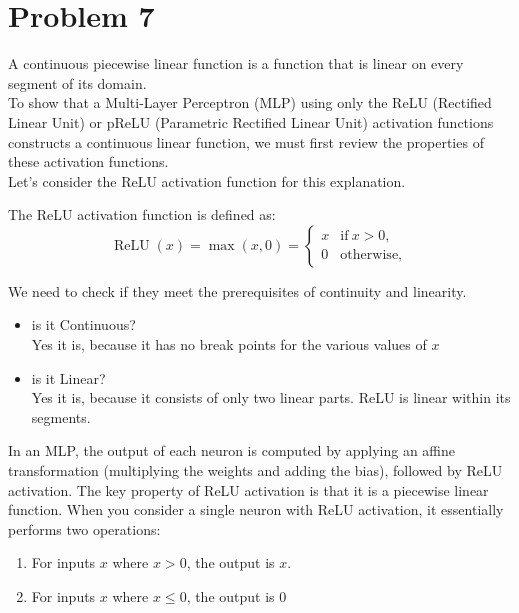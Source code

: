 \section{Problem 7}
A continuous piecewise linear function is a function that is linear on every segment of its domain.\\
To show that a Multi-Layer Perceptron (MLP) using only the ReLU (Rectified Linear Unit) or pReLU (Parametric Rectified Linear Unit) activation functions constructs a continuous linear function, we must first review the properties of these activation functions. \\

Let’s consider the ReLU activation function for this explanation.

The ReLU activation function is defined as:\\
\begin{equation}
	\operatorname{ReLU}(x)=\operatorname*{max}(x,0)={\left\{\begin{array}{ll}
			{x}&{{\mathrm{if~}}x>0,}\\ 
			{0}&{{\mathrm{otherwise,}}}
			\end{array}\right.}		
\end{equation}

We need to check if they meet the prerequisites of continuity and linearity.
\begin{itemize}
	\item is it Continuous?\\
	Yes it is, because it has no break points for the various values of $x$
	\item is it Linear?\\
	Yes it is, because it consists of only two linear parts. ReLU is linear within its segments.
\end{itemize}

In an MLP, the output of each neuron is computed by applying an affine transformation (multiplying the weights and adding the bias), followed by ReLU activation. The key property of ReLU activation is that it is a piecewise linear function.
When you consider a single neuron with ReLU activation, it essentially performs two operations:
\begin{enumerate}
	\item For inputs $x$ where $x > 0$, the output is $x$.
	\item For inputs $x$ where $x \leq 0$, the output is $0$
\end{enumerate}

